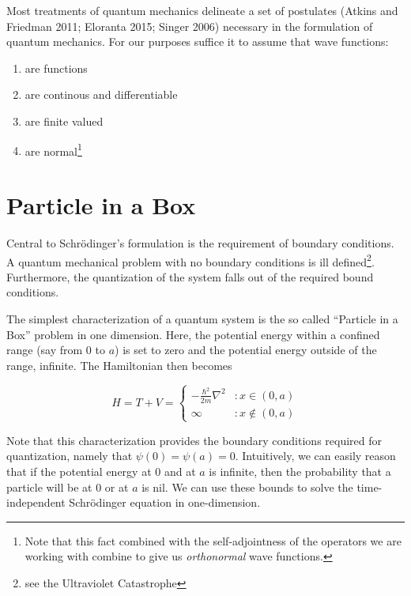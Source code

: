 \documentclass[12pt,]{book}
\providecommand{\tightlist}{%
  \setlength{\itemsep}{0pt}\setlength{\parskip}{0pt}}
\begin{document}
Most treatments of quantum mechanics delineate a set of postulates
(Atkins and Friedman 2011; Eloranta 2015; Singer 2006) necessary in the
formulation of quantum mechanics. For our purposes suffice it to assume
that wave functions:

\begin{enumerate}
\def\labelenumi{\arabic{enumi}.}
\tightlist
\item
  are functions
\item
  are continous and differentiable
\item
  are finite valued
\item
  are
  normal\footnote{Note that this fact combined with the self-adjointness of the 
  operators we are working with combine to give us \emph{orthonormal} wave functions.}
\end{enumerate}

\section{Particle in a Box}\label{particle-in-a-box}

Central to Schrödinger's formulation is the requirement of boundary
conditions. A quantum mechanical problem with no boundary conditions is
ill defined\footnote{see the Ultraviolet Catastrophe}. Furthermore, the
quantization of the system falls out of the required bound conditions.

The simplest characterization of a quantum system is the so called
``Particle in a Box'' problem in one dimension. Here, the potential
energy within a confined range (say from 0 to \(a\)) is set to zero and
the potential energy outside of the range, infinite. The Hamiltonian
then becomes

\begin{equation}
   H = T + V =  \left\{
     \begin{array}{lr}
       -\frac{\hbar^2}{2m}\nabla^2 & : x \in (0,a)\\
       \infty & : x \notin (0,a)
     \end{array}
   \right.
\label{eq:hamiltonian_particle_in_a_box}\end{equation}

Note that this characterization provides the boundary conditions
required for quantization, namely that \(\psi(0)=\psi(a)=0\).
Intuitively, we can easily reason that if the potential energy at 0 and
at \(a\) is infinite, then the probability that a particle will be at 0
or at \(a\) is nil. We can use these bounds to solve the
time-independent Schrödinger equation in one-dimension.
\end{document}
